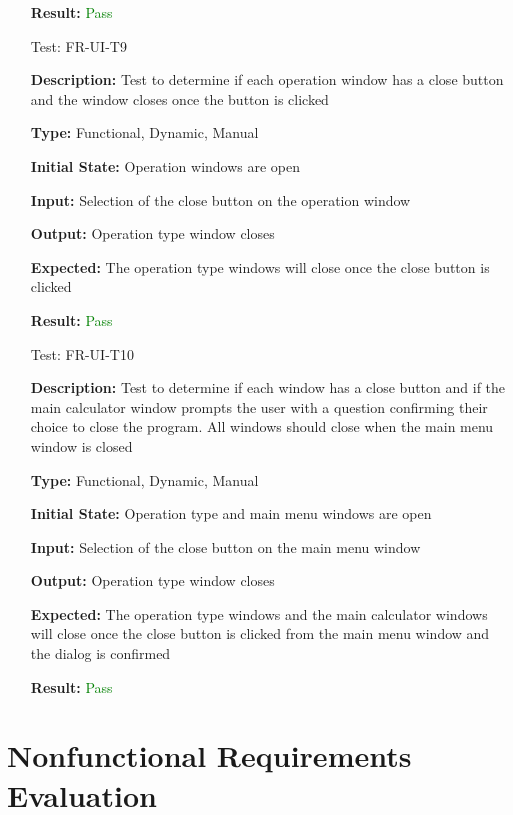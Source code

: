 \documentclass[12pt, titlepage]{article}
\begin{document}
\begin{enumerate}
\textbf{Result:} \textcolor{Green}{Pass}

\item[Test:]{FR-UI-T9\\}

\textbf{Description:} Test to determine if each operation window has a close button and the window closes once the button is clicked

\textbf{Type:} Functional, Dynamic, Manual
					
\textbf{Initial State:} Operation windows are open
					
\textbf{Input:} Selection of the close button on the operation window
					
\textbf{Output:} Operation type window closes

\textbf{Expected:} The operation type windows will close once the close button is clicked

\textbf{Result:} \textcolor{Green}{Pass}

\item[Test:]{FR-UI-T10\\}

\textbf{Description:} Test to determine if each window has a close button and if the main calculator window prompts the user with a question confirming their choice to close the program. All windows should close when the main menu window is closed 

\textbf{Type:} Functional, Dynamic, Manual
					
\textbf{Initial State:} Operation type and main menu windows are open
					
\textbf{Input:} Selection of the close button on the main menu window 
					
\textbf{Output:} Operation type window closes

\textbf{Expected:} The operation type windows and the main calculator windows will close once the close button is clicked from the main menu window and the dialog is confirmed

\textbf{Result:} \textcolor{Green}{Pass}

\end{enumerate}

\section{Nonfunctional Requirements Evaluation}
\end{document}
